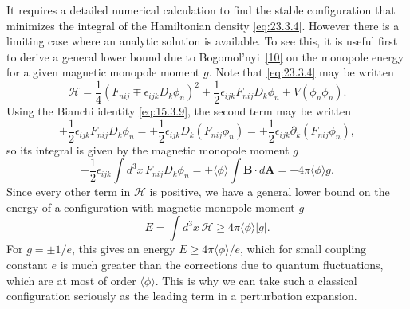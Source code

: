 It requires a detailed numerical calculation to find the stable
configuration that minimizes the integral of the Hamiltonian density
\eqref{eq:23.3.4}. However there is a limiting case where an analytic
solution is available. To see this, it is useful first to derive a general
lower bound due to Bogomol'nyi~\hyperref[ch23-ref-10]{[10]} on the
monopole energy for a given magnetic monopole moment $g$. Note that
\eqref{eq:23.3.4} may be written
\begin{equation}
 \mathcal H=\frac14(F_{nij}\mp\epsilon_{ijk}D_k\phi_n)^2
 \mathbin{\pm}\frac12\epsilon_{ijk}F_{nij}D_k\phi_n
 +V(\phi_n\phi_n).
 \tag{23.3.18}\label{eq:23.3.18}
\end{equation}
Using the Bianchi identity \eqref{eq:15.3.9}, the second term may be
written
\[
 \mathbin{\pm}\frac12\epsilon_{ijk}F_{nij}D_k\phi_n
 =\mathbin{\pm}\frac12\epsilon_{ijk}D_k(F_{nij}\phi_n)
 =\mathbin{\pm}\frac12\epsilon_{ijk}\partial_k(F_{nij}\phi_n),
\]
so its integral is given by the magnetic monopole moment $g$
\[
 \mathbin{\pm}\frac12\epsilon_{ijk}\int d^3x\,
 F_{nij}D_k\phi_n
 =\mathbin{\pm}\langle\phi\rangle\int\mathbf B\cdot d\mathbf A
 =\mathbin{\pm}4\pi\langle\phi\rangle g.
\]
Since every other term in $\mathcal H$ is positive, we have a general
lower bound on the energy of a configuration with magnetic monopole
moment $g$
\begin{equation}
 E=\int d^3x\,\mathcal H
 \geq4\pi\langle\phi\rangle|g|.
 \tag{23.3.19}\label{eq:23.3.19}
\end{equation}
For $g=\pm1/e$, this gives an energy
$E\geq4\pi\langle\phi\rangle/e$, which for small coupling constant $e$ is
much greater than the corrections due to quantum fluctuations, which are
at most of order $\langle\phi\rangle$. This is why we can take such a
classical configuration seriously as the leading term in a perturbation
expansion.

